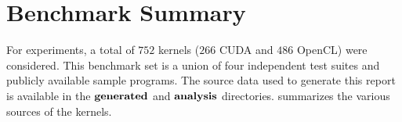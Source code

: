 \section{Benchmark Summary}
For experiments, a total of $752$ kernels ($266$ CUDA and $486$ OpenCL) were considered. This benchmark set is a union of four independent test suites and publicly available \cite{cudatoolkit} sample programs. The source data used to generate this report is available in the $\mathbf{generated}$ and $\mathbf{analysis}$ directories.  summarizes the various sources of the kernels.


